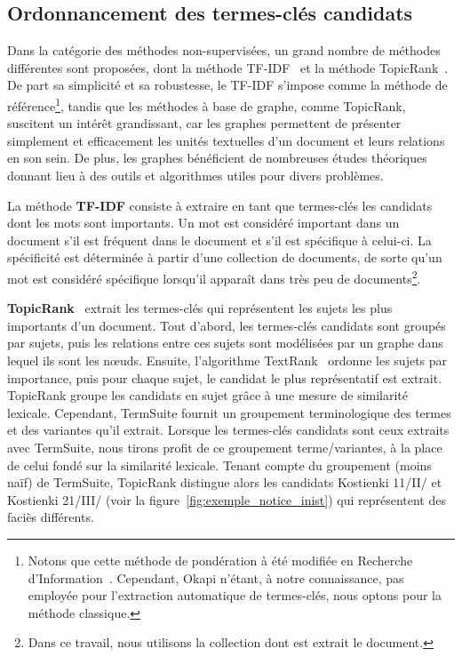   \subsection{Ordonnancement des termes-clés candidats}
  \label{subsec:extraction_de_termes_cles}
    Dans la catégorie des méthodes non-supervisées, un grand nombre de méthodes
    différentes sont proposées, dont la méthode TF-IDF~\cite{jones1972tfidf} et
    la méthode TopicRank~\cite{bougouin2013topicrank}. De part sa simplicité et
    sa robustesse, le TF-IDF s'impose comme la méthode de
    référence\footnote{Notons que cette méthode de pondération à été modifiée en
    Recherche
    d'Information~\cite[Okapi]{robertson1999okapi,claveau2012vectorisation}.
    Cependant, Okapi n'étant, à notre connaissance, pas employée pour
    l'extraction automatique de termes-clés, nous optons pour la méthode
    classique.}, tandis que les méthodes à base de graphe, comme TopicRank,
    suscitent un intérêt grandissant, car les graphes permettent de présenter
    simplement et efficacement les unités textuelles d'un document et leurs
    relations en son sein. De plus, les graphes bénéficient de nombreuses études
    théoriques donnant lieu à des outils et algorithmes utiles pour divers
    problèmes.

    La méthode \textbf{TF-IDF} consiste à extraire en tant que termes-clés les
    candidats dont les mots sont importants. Un mot est considéré
    important dans un document s'il est fréquent dans le document et s'il est
    spécifique à celui-ci. La spécificité est déterminée à partir d'une
    collection de documents, de sorte qu'un mot est considéré spécifique
    lorsqu'il apparaît dans très peu de documents\footnote{Dans ce travail, nous
    utilisons la collection dont est extrait le document.}.

    \textbf{TopicRank}~\cite{bougouin2013topicrank} extrait les termes-clés qui
    représentent les sujets les plus importants d'un document. Tout d'abord, les
    termes-clés candidats sont groupés par sujets, puis les relations entre ces
    sujets sont modélisées par un graphe dans lequel ils sont les n\oe{}uds.
    Ensuite, l'algorithme TextRank~\cite{mihalcea2004textrank} ordonne les
    sujets par importance, puis pour chaque sujet, le candidat le plus
    représentatif est extrait. TopicRank groupe les candidats en sujet grâce à
    une mesure de similarité lexicale. Cependant, TermSuite fournit un
    groupement terminologique des termes et des variantes qu'il extrait. Lorsque
    les termes-clés candidats sont ceux extraits avec TermSuite, nous tirons
    profit de ce groupement terme/variantes, à la place de celui fondé sur la
    similarité lexicale. Tenant compte du groupement (moins naïf) de TermSuite,
    TopicRank distingue alors les candidats \og{}Kostienki
    11/II/\fg{} et \og{}Kostienki 21/III/\fg{} (voir la
    figure~\ref{fig:exemple_notice_inist}) qui représentent des faciès
    différents.

